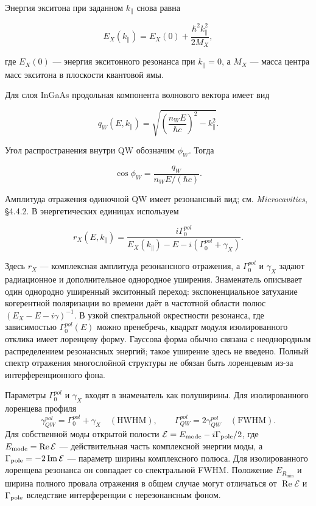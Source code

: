 \documentclass[12pt,a4paper]{article}
\begin{document}
Энергия экситона при заданном $k_\parallel$ снова равна

\[
E_X(k_\parallel)
=
E_X(0)
+
\frac{\hbar^2k_\parallel^2}{2M_X},
\]

где $E_X(0)$ --- энергия экситонного резонанса при $k_\parallel=0$, а $M_X$ --- масса центра масс экситона в плоскости квантовой ямы.

Для слоя InGaAs продольная компонента волнового вектора имеет вид

\[
q_W(E,k_\parallel)
=
\sqrt{
\left(\frac{n_WE}{\hbar c}\right)^2-k_\parallel^2
}.
\]

Угол распространения внутри QW обозначим $\phi_W$. Тогда

\[
\cos\phi_W
=
\frac{q_W}{n_WE/(\hbar c)}.
\]

Амплитуда отражения одиночной QW имеет резонансный вид; см. \textit{Microcavities}, \S4.4.2. В энергетических единицах используем

\[
r_X(E,k_\parallel)
=
\frac{i\Gamma_0^{pol}}
{E_X(k_\parallel)-E-i\left(\Gamma_0^{pol}+\gamma_X\right)}.
\]


Здесь $r_X$ --- комплексная амплитуда резонансного отражения, а
$\Gamma_0^{pol}$ и $\gamma_X$ задают радиационное и дополнительное однородное
уширения. Знаменатель описывает один однородно уширенный экситонный переход:
экспоненциальное затухание когерентной поляризации во времени даёт в
частотной области полюс $(E_X-E-i\gamma)^{-1}$. В узкой спектральной
окрестности резонанса, где зависимостью $\Gamma_0^{pol}(E)$ можно пренебречь,
квадрат модуля изолированного отклика имеет лоренцеву форму. Гауссова форма
обычно связана с неоднородным распределением резонансных энергий; такое
уширение здесь не введено. Полный спектр отражения многослойной структуры
не обязан быть лоренцевым из-за интерференционного фона.

Параметры $\Gamma_0^{pol}$ и $\gamma_X$ входят в знаменатель как полуширины.
Для изолированного лоренцева профиля
\[
\gamma_{QW}^{pol}=\Gamma_0^{pol}+\gamma_X\quad(\mathrm{HWHM}),
\qquad
\Gamma_{QW}^{pol}=2\gamma_{QW}^{pol}\quad(\mathrm{FWHM}).
\]
Для собственной моды открытой полости
$\mathcal E=E_{\rm mode}-i\Gamma_{\rm pole}/2$,
где $E_{\rm mode}=\operatorname{Re}\mathcal E$ --- действительная часть
комплексной энергии моды, а
$\Gamma_{\rm pole}=-2\operatorname{Im}\mathcal E$ --- параметр ширины
комплексного полюса. Для изолированного лоренцева резонанса он совпадает со
спектральной FWHM. Положение $E_{R_{\min}}$ и ширина полного провала
отражения в общем случае могут отличаться от
$\operatorname{Re}\mathcal E$ и $\Gamma_{\rm pole}$ вследствие интерференции с
нерезонансным фоном.
\end{document}
